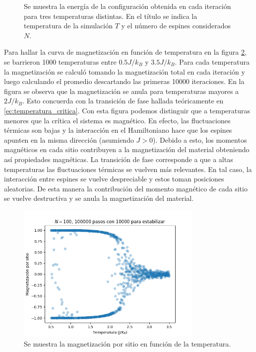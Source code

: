\documentclass{article}
\begin{document}
\begin{figure}
\begin{subfigure}{0.7\textwidth}
\end{subfigure}
\caption{\label{fig:energias}Se muestra la energía de la configuración obtenida en cada iteración para tres temperaturas distintas. En el título se indica la temperatura de la simulación $T$ y el número de espines considerados $N$.}
\end{figure}

Para hallar la curva de magnetización en función de temperatura en la figura \ref{fig:magnetizacion}, se barrieron 1000 temperaturas entre $0.5J/k_B$ y $3.5J/k_B$. Para cada temperatura la magnetización se calculó tomando la magnetización total en cada iteración y luego calculando el promedio descartando las primeras 10000 iteraciones. En la figura se observa que la magnetización se anula para temperaturas mayores a $2J/k_B$. Esto concuerda con la transición de fase hallada teóricamente en \eqref{ec:temperatura_critica}. Con esta figura podemos distinguir que a temperaturas menores que la crítica el sistema es magnético. En efecto, las fluctuaciones térmicas son bajas y la interacción en el Hamiltoniano hace que los espines apunten en la misma dirección (asumiendo $J>0$). Debido a esto, los momentos magnéticos en cada sitio contribuyen a la magnetización del material obteniendo así propiedades magnéticas. La transición de fase corresponde a que a altas temperaturas las fluctuaciones térmicas se vuelven más relevantes. En tal caso, la interacción entre espines se vuelve despreciable y estos toman posiciones aleatorias. De esta manera la contribución del momento magnético de cada sitio se vuelve destructiva y se anula la magnetización del material. 

\begin{figure}
\centering
\includegraphics[width = 0.8\textwidth]{magnetizacion.png}
\caption{\label{fig:magnetizacion}Se muestra la magnetización por sitio en función de la temperatura.}
\end{figure}
\end{document}
